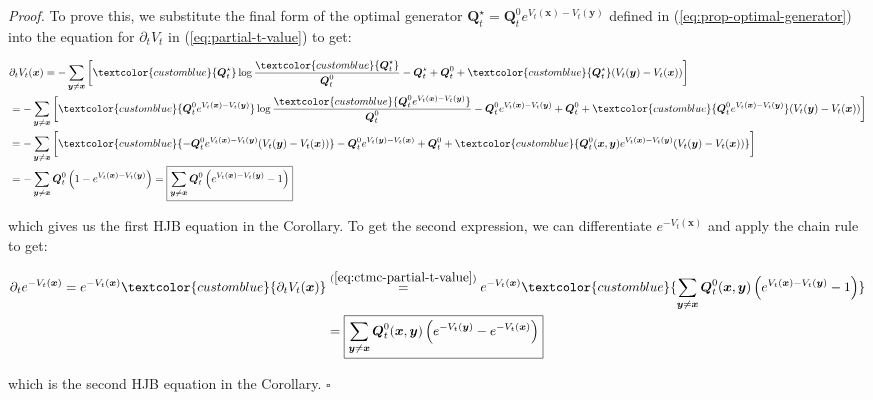 \documentclass{article}
\newcommand{\bluetext}[1]{\textcolor{customblue}{#1}}
\begin{document}
\textit{Proof.} To prove this, we substitute the final form of the optimal generator $\boldsymbol{Q}^\star_t=\boldsymbol{Q}^0_te^{V_t(\boldsymbol{x})-V_t(\boldsymbol{y})}$ defined in (\ref{eq:prop-optimal-generator}) into the equation for $\partial_tV_t$ in (\ref{eq:partial-t-value}) to get:
\begin{small}
\begin{align}
&\partial_tV_t(\boldsymbol{x})=-\sum_{\boldsymbol{y}\neq \boldsymbol{x}}\bigg[\bluetext{\boldsymbol{Q}^\star_t}\log \frac{\bluetext{\boldsymbol{Q}^\star_t}}{\boldsymbol{Q}_t^0}-\boldsymbol{Q}^\star_t+\boldsymbol{Q}^0_t+\bluetext{\boldsymbol{Q}^\star_t}(V_t(\boldsymbol{y})-V_t(\boldsymbol{x}))\bigg]\nonumber\\
&=-\sum_{\boldsymbol{y}\neq \boldsymbol{x}}\bigg[\bluetext{\boldsymbol{Q}^0_te^{V_t(\boldsymbol{x})-V_t(\boldsymbol{y})}}\log \frac{\bluetext{\boldsymbol{Q}^0_te^{V_t(\boldsymbol{x})-V_t(\boldsymbol{y})}}}{\boldsymbol{Q}_t^0}-\boldsymbol{Q}^0_te^{V_t(\boldsymbol{x})-V_t(\boldsymbol{y})}+\boldsymbol{Q}^0_t+\bluetext{\boldsymbol{Q}^0_te^{V_t(\boldsymbol{x})-V_t(\boldsymbol{y})}}(V_t(\boldsymbol{y})-V_t(\boldsymbol{x}))\bigg]\nonumber\\
&=-\sum_{\boldsymbol{y}\neq \boldsymbol{x}}\bigg[\bluetext{-\boldsymbol{Q}^0_te^{V_t(\boldsymbol{x})-V_t(\boldsymbol{y})}(V_t(\boldsymbol{y})-V_t(\boldsymbol{x}))}-\boldsymbol{Q}^0_te^{V_t(\boldsymbol{y})-V_t(\boldsymbol{x})}+\boldsymbol{Q}^0_t+\bluetext{\boldsymbol{Q}^0_t(\boldsymbol{x},\boldsymbol{y})e^{V_t(\boldsymbol{x})-V_t(\boldsymbol{y})}(V_t(\boldsymbol{y})-V_t(\boldsymbol{x}))}\bigg]\nonumber\\
&=-\sum_{\boldsymbol{y}\neq \boldsymbol{x}}\boldsymbol{Q}^0_t\left(1-e^{V_t(\boldsymbol{x})-V_t(\boldsymbol{y})}\right)=\boxed{\sum_{\boldsymbol{y}\neq \boldsymbol{x}}\boldsymbol{Q}^0_t\left(e^{V_t(\boldsymbol{x})-V_t(\boldsymbol{y})}-1\right)}\label{eq:ctmc-partial-t-value}
\end{align}
\end{small}
which gives us the first HJB equation in the Corollary. To get the second expression, we can differentiate $e^{-V_t(\boldsymbol{x})}$ and apply the chain rule to get:
\begin{small}
\begin{align}
    \partial_te^{-V_t(\boldsymbol{x})}=e^{-V_t(\boldsymbol{x})}\bluetext{\partial_tV_t(\boldsymbol{x})}&\overset{(\ref{eq:ctmc-partial-t-value})}{=}e^{-V_t(\boldsymbol{x})}\bluetext{\sum_{\boldsymbol{y}\neq \boldsymbol{x}}\boldsymbol{Q}^0_t(\boldsymbol{x},\boldsymbol{y})\left(e^{V_t(\boldsymbol{x})-V_t(\boldsymbol{y})}-1\right)}\nonumber\\
    &=\boxed{\sum_{\boldsymbol{y}\neq \boldsymbol{x}}\boldsymbol{Q}^0_t(\boldsymbol{x},\boldsymbol{y})\left(e^{-V_t(\boldsymbol{y})}-e^{-V_t(\boldsymbol{x})}\right)}
\end{align}
\end{small}
which is the second HJB equation in the Corollary. \hfill $\square$
\end{document}
